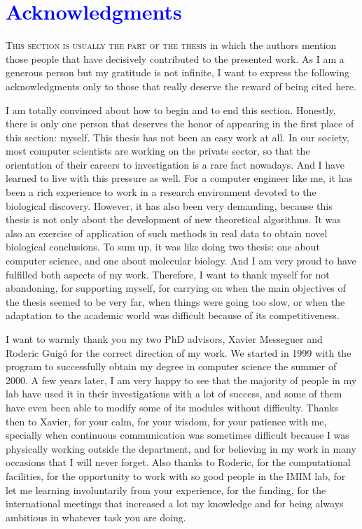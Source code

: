\chapter*{\textcolor{blue}{\textbf{A}cknowledgments}}

\lettrine[lines=4,loversize=-0.1,lraise=0.1,lhang=.2]{T}{his section is usually the part of the thesis}
in which the authors mention those people that have decisively contributed to the 
presented work. As I am a generous person but my gratitude is not infinite,
I want to express the following acknowledgments only to those that really deserve 
the reward of being cited here.

I am totally convinced about how to begin and to end this 
section. Honestly, there is only one person that deserves the honor
of appearing in the first place of this section: myself. This thesis 
has not been an easy work at all. In our society, most computer scientists
are working on the private sector, so that the orientation of their careers 
to investigation is a rare fact nowadays. And I have learned to live with 
this pressure as well. For a computer engineer like me, it has been a rich 
experience to work in a research environment 
devoted to the biological discovery. However, it has also been very demanding, 
because this thesis is not only about the development of new theoretical 
algorithms. It was also an exercise of application of such methods in real data 
to obtain novel biological conclusions. To sum up, it was like doing two thesis: 
one about computer science, and one about molecular biology. And I am very proud 
to have fulfilled both aspects of my work. Therefore, I want to thank myself 
for not abandoning, for supporting myself, for carrying on when the main 
objectives of the thesis seemed to be very far, when things were going too slow, or
when the adaptation to the academic world was difficult because of its
competitiveness.

I want to warmly thank you my two PhD advisors, Xavier Messeguer and Roderic Guig\'o 
for the correct direction of my work. We started in 1999 with the program 
 to successfully obtain my degree in computer science the summer 
of 2000. A few years later, I am very happy to see that the majority of people 
in my lab have used it in their investigations with a lot of success, and some of 
them have even been able to modify some of its modules without difficulty. Thanks 
then to Xavier, for your calm, for your wisdom, for your patience with me, specially 
when continuous communication was sometimes difficult because I was physically 
working outside the department, and for believing in my work in many occasions that
I will never forget. Also thanks to Roderic, for the computational facilities, 
for the opportunity to work with so good people in the IMIM lab, for let me 
learning involuntarily from your experience, for the funding, for the international 
meetings that increased a lot my knowledge and for being always ambitious in whatever 
task you are doing.

